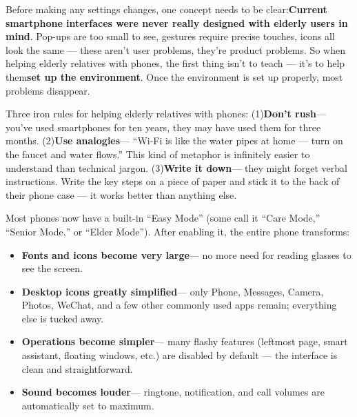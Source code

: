 


Before making any settings changes, one concept needs to be clear:\textbf{Current smartphone interfaces were never really designed with elderly users in mind}. Pop-ups are too small to see, gestures require precise touches, icons all look the same — these aren't user problems, they're product problems. So when helping elderly relatives with phones, the first thing isn't to teach — it's to help them\textbf{set up the environment}. Once the environment is set up properly, most problems disappear.

Three iron rules for helping elderly relatives with phones: (1)\textbf{Don't rush}— you've used smartphones for ten years, they may have used them for three months. (2)\textbf{Use analogies}— “Wi-Fi is like the water pipes at home — turn on the faucet and water flows.” This kind of metaphor is infinitely easier to understand than technical jargon. (3)\textbf{Write it down}— they might forget verbal instructions. Write the key steps on a piece of paper and stick it to the back of their phone case — it works better than anything else.


Most phones now have a built-in “Easy Mode” (some call it “Care Mode,” “Senior Mode,” or “Elder Mode”). After enabling it, the entire phone transforms:

\begin{itemize}
  \item \textbf{Fonts and icons become very large}— no more need for reading glasses to see the screen.
  \item \textbf{Desktop icons greatly simplified}— only Phone, Messages, Camera, Photos, WeChat, and a few other commonly used apps remain; everything else is tucked away.
  \item \textbf{Operations become simpler}— many flashy features (leftmost page, smart assistant, floating windows, etc.) are disabled by default — the interface is clean and straightforward.
  \item \textbf{Sound becomes louder}— ringtone, notification, and call volumes are automatically set to maximum.
\end{itemize}

